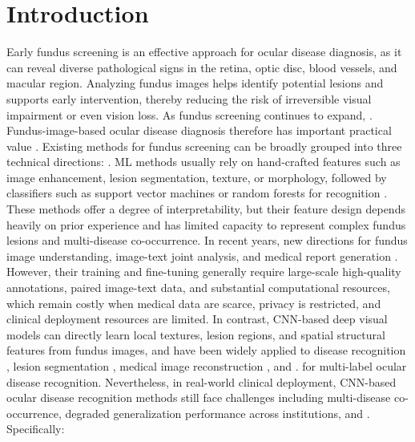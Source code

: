 
\section{Introduction}

Early fundus screening is an effective approach for ocular disease diagnosis, as it can reveal diverse pathological signs in the retina, optic disc, blood vessels, and macular region. Analyzing fundus images helps identify potential lesions and supports early intervention, thereby reducing the risk of irreversible visual impairment or even vision loss. As fundus screening continues to expand, . Fundus-image-based ocular disease diagnosis therefore has important practical value \cite{_Ref213949315}. Existing methods for fundus screening can be broadly grouped into three technical directions: . ML methods usually rely on hand-crafted features such as image enhancement, lesion segmentation, texture, or morphology, followed by classifiers such as support vector machines or random forests for recognition \cite{_RefRahman2022MLFundus}. These methods offer a degree of interpretability, but their feature design depends heavily on prior experience and has limited capacity to represent complex fundus lesions and multi-disease co-occurrence. In recent years,  new directions for fundus image understanding, image-text joint analysis, and medical report generation . However, their training and fine-tuning generally require large-scale high-quality annotations, paired image-text data, and substantial computational resources, which remain costly when medical data are scarce, privacy is restricted, and clinical deployment resources are limited. In contrast, CNN-based deep visual models can directly learn local textures, lesion regions, and spatial structural features from fundus images, and have been widely applied to disease recognition \cite{_Ref213871637}, lesion segmentation \cite{_Ref213948625}, medical image reconstruction \cite{_Ref213948898}, and .   for multi-label ocular disease recognition. Nevertheless, in real-world clinical deployment, CNN-based ocular disease recognition methods still face challenges including multi-disease co-occurrence, degraded generalization performance across institutions, and . Specifically:

